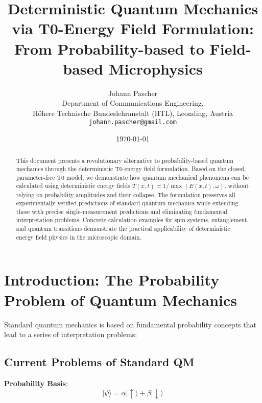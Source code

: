 \documentclass[12pt,a4paper]{article}
\newcommand{\Tfield}{T(x,t)}
\newcommand{\Efield}{E(x,t)}
\newcommand{\psiket}[1]{|#1\rangle}
\begin{document}
	
	\title{Deterministic Quantum Mechanics via T0-Energy Field Formulation: \\
		From Probability-based to Field-based Microphysics}
	\author{Johann Pascher\\
		Department of Communications Engineering, \\H{\"o}here Technische Bundeslehranstalt (HTL), Leonding, Austria\\
		\texttt{johann.pascher@gmail.com}}
	\date{\today}
	
	\maketitle
	
	\begin{abstract}
		This document presents a revolutionary alternative to probability-based quantum mechanics through the deterministic T0-energy field formulation. Based on the closed, parameter-free T0 model, we demonstrate how quantum mechanical phenomena can be calculated using deterministic energy fields $\Tfield = 1/\max(\Efield, \omega)$, without relying on probability amplitudes and their collapse. The formulation preserves all experimentally verified predictions of standard quantum mechanics while extending these with precise single-measurement predictions and eliminating fundamental interpretation problems. Concrete calculation examples for spin systems, entanglement, and quantum transitions demonstrate the practical applicability of deterministic energy field physics in the microscopic domain.
	\end{abstract}
	
	\tableofcontents
	\newpage
	
	\section{Introduction: The Probability Problem of Quantum Mechanics}
	
	Standard quantum mechanics is based on fundamental probability concepts that lead to a series of interpretation problems:
	
	\subsection{Current Problems of Standard QM}
	
	\textbf{Probability Basis}:
	\begin{equation}
		\psiket{\psi} = \alpha\psiket{\uparrow} + \beta\psiket{\downarrow}
	\end{equation}
	
\end{document}
